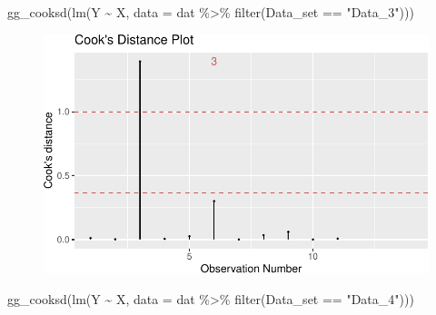 \documentclass[
  letterpaper,
  DIV=11,
  numbers=noendperiod]{scrreprt}
\newenvironment{Shaded}{\begin{snugshade}}{\end{snugshade}}
\newcommand{\AttributeTok}[1]{\textcolor[rgb]{0.40,0.45,0.13}{#1}}
\newcommand{\FunctionTok}[1]{\textcolor[rgb]{0.28,0.35,0.67}{#1}}
\newcommand{\NormalTok}[1]{\textcolor[rgb]{0.00,0.23,0.31}{#1}}
\newcommand{\SpecialCharTok}[1]{\textcolor[rgb]{0.37,0.37,0.37}{#1}}
\newcommand{\StringTok}[1]{\textcolor[rgb]{0.13,0.47,0.30}{#1}}
\begin{document}
\begin{Shaded}
\begin{Highlighting}[]
\FunctionTok{gg\_cooksd}\NormalTok{(}\FunctionTok{lm}\NormalTok{(Y }\SpecialCharTok{\textasciitilde{}}\NormalTok{ X, }\AttributeTok{data =}\NormalTok{ dat }\SpecialCharTok{\%\textgreater{}\%} \FunctionTok{filter}\NormalTok{(Data\_set }\SpecialCharTok{==} \StringTok{"Data\_3"}\NormalTok{)))}
\end{Highlighting}
\end{Shaded}

\begin{figure}[H]

{\centering \includegraphics{./08-linearreg_files/figure-pdf/unnamed-chunk-28-3.pdf}

}

\end{figure}

\begin{Shaded}
\begin{Highlighting}[]
\FunctionTok{gg\_cooksd}\NormalTok{(}\FunctionTok{lm}\NormalTok{(Y }\SpecialCharTok{\textasciitilde{}}\NormalTok{ X, }\AttributeTok{data =}\NormalTok{ dat }\SpecialCharTok{\%\textgreater{}\%} \FunctionTok{filter}\NormalTok{(Data\_set }\SpecialCharTok{==} \StringTok{"Data\_4"}\NormalTok{)))}
\end{Highlighting}
\end{Shaded}
\end{document}
